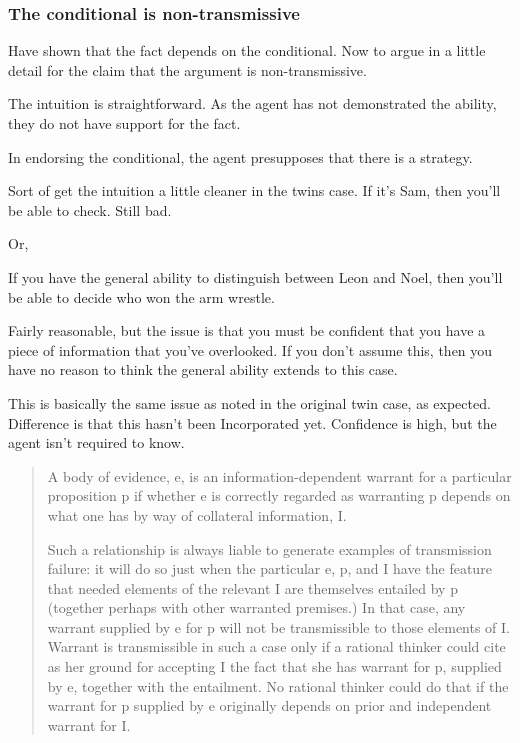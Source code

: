 \documentclass[10pt]{article}
\begin{document}
\newpage

\subsubsection{The conditional is non-transmissive}
\label{sec:argum-non-transm}

\begin{note}[Overview]
  Have shown that the fact depends on the conditional.
  Now to argue in a little detail for the claim that the argument is non-transmissive.
\end{note}

The intuition is straightforward.
As the agent has not demonstrated the ability, they do not have support for the fact.

In endorsing the conditional, the agent presupposes that there is a strategy.

Sort of get the intuition a little cleaner in the twins case.
If it's Sam, then you'll be able to check.
Still bad.

Or,

If you have the general ability to distinguish between Leon and Noel, then you'll be able to decide who won the arm wrestle.

Fairly reasonable, but the issue is that you must be confident that you have a piece of information that you've overlooked.
If you don't assume this, then you have no reason to think the general ability extends to this case.

This is basically the same issue as noted in the original twin case, as expected.
{
  \color{red}
  Difference is that this hasn't been Incorporated yet.
  Confidence is high, but the agent isn't required to know.
}


\begin{quote}
  A body of evidence, e, is an information-dependent warrant for a particular proposition p if whether e is correctly regarded as warranting p depends on what one has by way of collateral information, I.

  Such a relationship is always liable to generate examples of transmission failure:
  it will do so just when the particular e, p, and I have the feature that needed elements of the relevant I are themselves entailed by p (together perhaps with other warranted premises.)
  In that case, any warrant supplied by e for p will not be transmissible to those elements of I.
  Warrant is transmissible in such a case only if a rational thinker could cite as her ground for accepting I the fact that she has warrant for p, supplied by e, together with the entailment.
  No rational thinker could do that if the warrant for p supplied by e originally depends on prior and independent warrant for I.
\end{quote}
\end{document}
